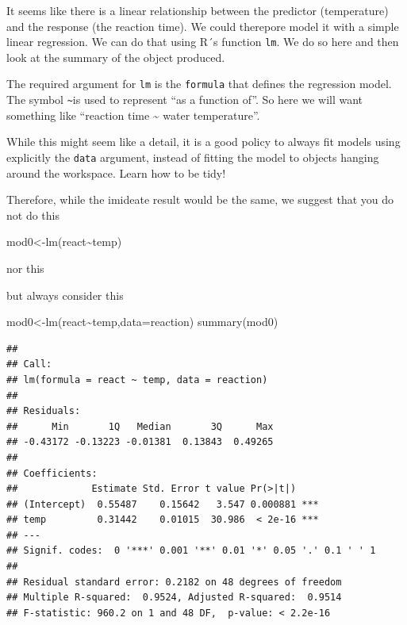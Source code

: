 \documentclass[
]{book}
\newenvironment{Shaded}{\begin{snugshade}}{\end{snugshade}}
\newcommand{\AttributeTok}[1]{\textcolor[rgb]{0.77,0.63,0.00}{#1}}
\newcommand{\FunctionTok}[1]{\textcolor[rgb]{0.00,0.00,0.00}{#1}}
\newcommand{\NormalTok}[1]{#1}
\newcommand{\OtherTok}[1]{\textcolor[rgb]{0.56,0.35,0.01}{#1}}
\newcommand{\SpecialCharTok}[1]{\textcolor[rgb]{0.00,0.00,0.00}{#1}}
\begin{document}
It seems like there is a linear relationship between the predictor (temperature) and the response (the reaction time). We could therepore model it with a simple linear regression. We can do that using R´s function \texttt{lm}. We do so here and then look at the summary of the object produced.

The required argument for \texttt{lm} is the \texttt{formula} that defines the regression model. The symbol \texttt{\textasciitilde{}}is used to represent ``as a function of''. So here we will want something like ``reaction time \textasciitilde{} water temperature''.

While this might seem like a detail, it is a good policy to always fit models using explicitly the \texttt{data} argument, instead of fitting the model to objects hanging around the workspace. Learn how to be tidy!

Therefore, while the imideate result would be the same, we suggest that you do not do this

\begin{Shaded}
\begin{Highlighting}[]
\NormalTok{mod0}\OtherTok{\textless{}{-}}\FunctionTok{lm}\NormalTok{(react}\SpecialCharTok{\textasciitilde{}}\NormalTok{temp)}
\end{Highlighting}
\end{Shaded}

nor this

\begin{Shaded}
\end{Shaded}

but always consider this

\begin{Shaded}
\begin{Highlighting}[]
\NormalTok{mod0}\OtherTok{\textless{}{-}}\FunctionTok{lm}\NormalTok{(react}\SpecialCharTok{\textasciitilde{}}\NormalTok{temp,}\AttributeTok{data=}\NormalTok{reaction)}
\FunctionTok{summary}\NormalTok{(mod0)}
\end{Highlighting}
\end{Shaded}

\begin{verbatim}
## 
## Call:
## lm(formula = react ~ temp, data = reaction)
## 
## Residuals:
##      Min       1Q   Median       3Q      Max 
## -0.43172 -0.13223 -0.01381  0.13843  0.49265 
## 
## Coefficients:
##             Estimate Std. Error t value Pr(>|t|)    
## (Intercept)  0.55487    0.15642   3.547 0.000881 ***
## temp         0.31442    0.01015  30.986  < 2e-16 ***
## ---
## Signif. codes:  0 '***' 0.001 '**' 0.01 '*' 0.05 '.' 0.1 ' ' 1
## 
## Residual standard error: 0.2182 on 48 degrees of freedom
## Multiple R-squared:  0.9524, Adjusted R-squared:  0.9514 
## F-statistic: 960.2 on 1 and 48 DF,  p-value: < 2.2e-16
\end{verbatim}
\end{document}
